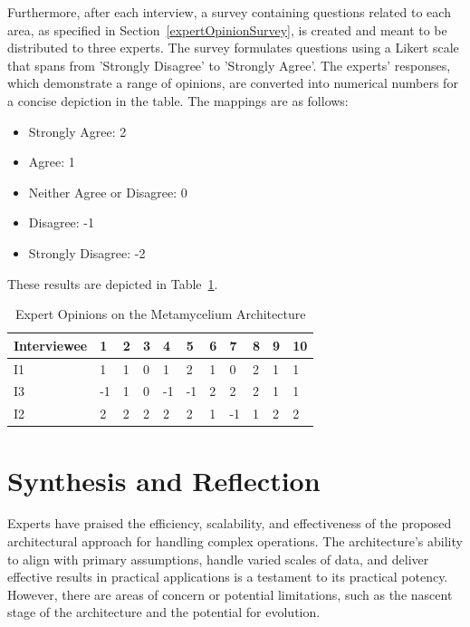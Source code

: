 \documentclass[journal]{IEEEtran}
\begin{document}
Furthermore, after each interview, a survey containing questions related to each area, as specified in Section~\ref{expertOpinionSurvey}, is created and meant to be distributed to three experts. The survey formulates questions using a Likert scale that spans from 'Strongly Disagree' to 'Strongly Agree'. The experts' responses, which demonstrate a range of opinions, are converted into numerical numbers for a concise depiction in the table. The mappings are as follows:

\begin{itemize}
  \item Strongly Agree: 2
  \item Agree: 1
  \item Neither Agree or Disagree: 0
  \item Disagree: -1
  \item Strongly Disagree: -2
\end{itemize}

These results are depicted in Table~\ref{tab:expertOpinionSurveyResults}.

\begin{table}[h]
  \centering
  \caption{Expert Opinions on the Metamycelium Architecture}
  \begin{tabularx}{\columnwidth}{l|X|X|X|X|X|X|X|X|X|X}
  \hline
  \textbf{Interviewee} & \textbf{1} & \textbf{2} & \textbf{3} & \textbf{4} & \textbf{5} & \textbf{6} & \textbf{7} & \textbf{8} & \textbf{9} & \textbf{10} \\
  \hline
  I1 & 1 & 1 & 0 & 1 & 2 & 1 & 0 & 2 & 1 & 1 \\
  I3 & -1 & 1 & 0 & -1 & -1 & 2 & 2 & 2 & 1 & 1 \\
  I2 & 2 & 2 & 2 & 2 & 2 & 1 & -1 & 1 & 2 & 2 \\
  \hline
  \end{tabularx}
  \label{tab:expertOpinionSurveyResults}
\end{table}


\section{Synthesis and Reflection} \label{expertOpinion_synthesisReflection}


Experts have praised the efficiency, scalability, and effectiveness of the proposed architectural approach for handling complex operations. The architecture's ability to align with primary assumptions, handle varied scales of data, and deliver effective results in practical applications is a testament to its practical potency. However, there are areas of concern or potential limitations, such as the nascent stage of the architecture and the potential for evolution.
\end{document}

